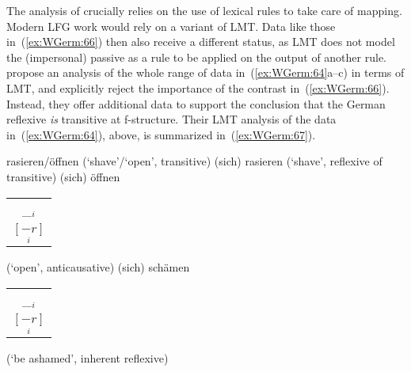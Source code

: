 \documentclass[output=paper,hidelinks]{langscibook}
\begin{document}
The analysis of \citeauthor{Sells1987-xz} crucially relies on the use of
lexical rules to take care of mapping. Modern LFG work would
rely on a variant of LMT. Data like those in~(\ref{ex:WGerm:66}) then
also receive a different status, as LMT does not model the
(impersonal) passive as a rule to be applied on the output of another
rule. \citet{AlencarKelling2005} propose an analysis of the whole
range of data in~(\ref{ex:WGerm:64}a--c) in terms of LMT, and explicitly
reject the importance of the contrast in~(\ref{ex:WGerm:66}). Instead, they offer
additional data to support the conclusion that the German reflexive \textit{is}
transitive at f-structure. Their LMT analysis of the data in~(\ref{ex:WGerm:64}), above,
is summarized in~(\ref{ex:WGerm:67}).
%
\begin{exe}
  \ex\label{ex:WGerm:67}
  \begin{xlist}
    \ex rasieren/öffnen
     \hfill (`shave'/`open', transitive)
    \ex (sich) rasieren
     \hfill (`shave', reflexive of transitive)
    \ex (sich) öffnen %
      \begin{tabular}[t]{@{}c@{}}{\_$_i$}\\$[-r]$\\\OBJ{}$_i$\rlap{$[$\REFL{}$]$}\end{tabular}%
      \hfill (`open', anticausative)
    \ex (sich) schämen %
      \begin{tabular}[t]{@{}c@{}}{\_$_i$}\\$[-r]$\\\OBJ{}$_i$\rlap{$[$\REFL{}$]$}\end{tabular}
    \hfill (`be ashamed', inherent reflexive)
  \end{xlist}
\end{exe}
\end{document}
